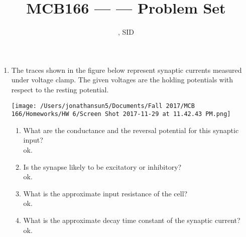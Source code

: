 \documentclass[11pt]{article}
\title{MCB166 --- \Session --- Problem Set \Homework}
\author{\Name, SID \SID}
\date{\displaydate{date}}
\begin{document}
\maketitle

\newpage
\begin{enumerate}[label=\arabic*.]
\item
The traces shown in the figure below represent synaptic currents measured under voltage clamp. The given voltages are the holding potentials with respect to the resting potential.
\begin{center}
\texttt{[image: /Users/jonathansun5/Documents/Fall 2017/MCB 166/Homeworks/HW 6/Screen Shot 2017-11-29 at 11.42.43 PM.png]}
\end{center}
\begin{enumerate}[label=(\alph*)]
\item
What are the conductance and the reversal potential for this synaptic input?
\vspace*{1\baselineskip}
\\
ok.













\item
Is the synapse likely to be excitatory or inhibitory?
\vspace*{1\baselineskip}
\\
ok.
















\item
What is the approximate input resistance of the cell?
\vspace*{1\baselineskip}
\\
ok.
















\item
What is the approximate decay time constant of the synaptic current?
\vspace*{1\baselineskip}
\\
ok.

















\end{enumerate}
\end{enumerate}
\end{document}
